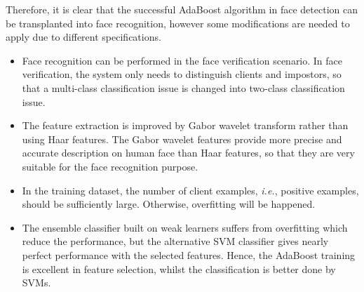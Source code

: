 Therefore, it is clear that the successful AdaBoost algorithm in face detection can be transplanted into face recognition, however some modifications are needed to apply due to different specifications.
\begin{itemize}
	\item Face recognition can be performed in the face verification scenario. In face verification, the system only needs to distinguish clients and impostors, so that a multi-class classification issue is changed into two-class classification issue.
	\item The feature extraction is improved by Gabor wavelet transform rather than using Haar features. The Gabor wavelet features provide more precise and accurate description on human face than Haar features, so that they are very suitable for the face recognition purpose.
	\item In the training dataset, the number of client examples, \textit{i.e.}, positive examples, should be sufficiently large. Otherwise, overfitting will be happened.
	\item The ensemble classifier built on weak learners suffers from overfitting which reduce the performance, but the alternative SVM classifier gives nearly perfect performance with the selected features. Hence, the AdaBoost training is excellent in feature selection, whilst the classification is better done by SVMs.  
\end{itemize}
 



